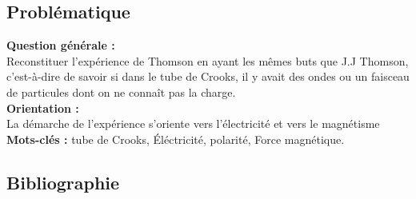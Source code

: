 \documentclass[../main.tex]{subfiles}
\begin{document}




 
\subsection{Problématique}

\textbf{Question générale :} \\
Reconstituer l'expérience de Thomson en ayant les mêmes buts que J.J Thomson, c'est-à-dire de savoir si dans le tube de Crooks, il y avait des ondes ou un faisceau de particules dont on ne connaît pas la charge.\\
\textbf{Orientation :}\\
La démarche de l'expérience s'oriente vers l'électricité et vers le magnétisme\\
\textbf{Mots-clés :}
 tube de Crooks,
 Éléctricité, polarité, 
 Force magnétique.

\subsection{Bibliographie }
\end{document}
